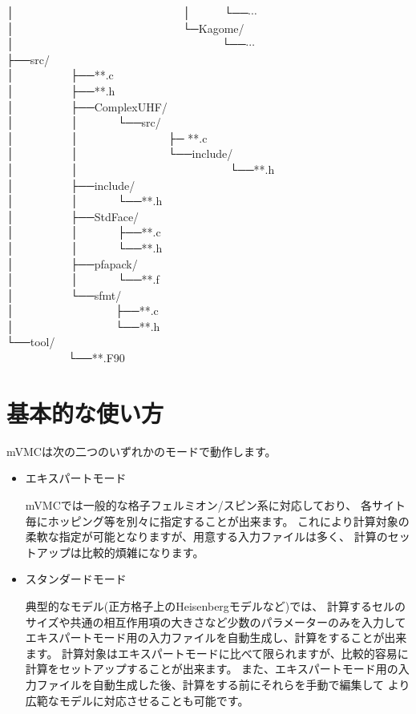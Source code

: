 │~~~~~~~~~~~~~~~~~~~~~~~~~~~~~~│~~~~~~└──$\cdots$\\
│~~~~~~~~~~~~~~~~~~~~~~~~~~~~~~└─Kagome/\\
│~~~~~~~~~~~~~~~~~~~~~~~~~~~~~~~~~~~~~└──$\cdots$\\
├──src/\\
│~~~~~~~~~~├──**.c\\
│~~~~~~~~~~├──**.h\\
│~~~~~~~~~~├──ComplexUHF/\\
│~~~~~~~~~~│~~~~~~~└──src/\\
│~~~~~~~~~~│~~~~~~~~~~~~~~~~├─ **.c\\
│~~~~~~~~~~│~~~~~~~~~~~~~~~~└──include/\\
│~~~~~~~~~~│~~~~~~~~~~~~~~~~~~~~~~~~~~~└──**.h\\
│~~~~~~~~~~├──include/\\
│~~~~~~~~~~│~~~~~~~└──**.h\\
│~~~~~~~~~~├──StdFace/\\
│~~~~~~~~~~│~~~~~~~├──**.c\\
│~~~~~~~~~~│~~~~~~~└──**.h\\
│~~~~~~~~~~├──pfapack/\\
│~~~~~~~~~~│~~~~~~~└──**.f\\
│~~~~~~~~~~└──sfmt/\\
│~~~~~~~~~~~~~~~~~~├──**.c\\
│~~~~~~~~~~~~~~~~~~└──**.h\\
└──tool/\\
~~~~~~~~~~~└──**.F90\\

\newpage
\section{基本的な使い方}

mVMCは次の二つのいずれかのモードで動作します。
\begin{itemize}
\item エキスパートモード

  mVMCでは一般的な格子フェルミオン/スピン系に対応しており、
  各サイト毎にホッピング等を別々に指定することが出来ます。
  これにより計算対象の柔軟な指定が可能となりますが、用意する入力ファイルは多く、
  計算のセットアップは比較的煩雑になります。
  
\item スタンダードモード

  典型的なモデル(正方格子上のHeisenbergモデルなど)では、
  計算するセルのサイズや共通の相互作用項の大きさなど少数のパラメーターのみを入力して
  エキスパートモード用の入力ファイルを自動生成し、計算をすることが出来ます。
  計算対象はエキスパートモードに比べて限られますが、比較的容易に計算をセットアップすることが出来ます。
  また、エキスパートモード用の入力ファイルを自動生成した後、計算をする前にそれらを手動で編集して
  より広範なモデルに対応させることも可能です。

\end{itemize}

